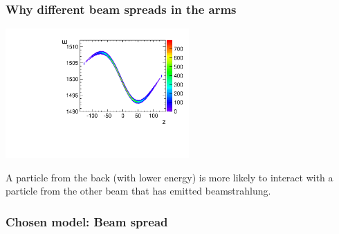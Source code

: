 \documentclass[handout]{beamer}
\begin{document}
\begin{frame}
\frametitle{Why different beam spreads in the arms}
\begin{center}
\includegraphics[width=7cm]{E_vs_v_colz_electrons}\\
\end{center}
A particle from the back (with lower energy) is more likely to
interact with a particle from the other beam that has emitted beamstrahlung.
\end{frame}

\begin{frame}
\frametitle{Chosen model: Beam spread}
\end{frame}
\end{document}
